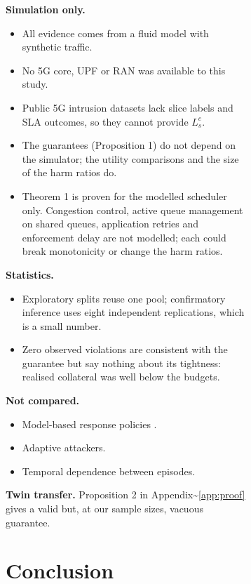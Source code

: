 \begin{figure}[!t]
{\begin{figure}[!t]
{\textbf{Simulation only.}

\begin{itemize}
\tightlist
\item
  All evidence comes from a fluid model with synthetic traffic.
\item
  No 5G core, UPF or RAN was available to this study.
\item
  Public 5G intrusion datasets \cite{siriwardhana2025nidd} lack slice
  labels and SLA outcomes, so they cannot provide \(L^c_s\).
\item
  The guarantees (Proposition 1) do not depend on the simulator; the
  utility comparisons and the size of the harm ratios do.
\item
  Theorem 1 is proven for the modelled scheduler only. Congestion
  control, active queue management on shared queues, application retries
  and enforcement delay are not modelled; each could break monotonicity
  or change the harm ratios.
\end{itemize}

\textbf{Statistics.}

\begin{itemize}
\tightlist
\item
  Exploratory splits reuse one pool; confirmatory inference uses eight
  independent replications, which is a small number.
\item
  Zero observed violations are consistent with the guarantee but say
  nothing about its tightness: realised collateral was well below the
  budgets.
\end{itemize}

\textbf{Not compared.}

\begin{itemize}
\tightlist
\item
  Model-based response policies
  \cite{hammar2022optimalstopping, hammar2024dynamic}.
\item
  Adaptive attackers.
\item
  Temporal dependence between episodes.
\end{itemize}

\textbf{Twin transfer.} Proposition 2 in
Appendix\textasciitilde{}\ref{app:proof} gives a valid but, at our
sample sizes, vacuous guarantee.

\hypertarget{sec:conclusion}{%
\section{Conclusion}\label{sec:conclusion}}

}
\end{figure}}
\end{figure}
